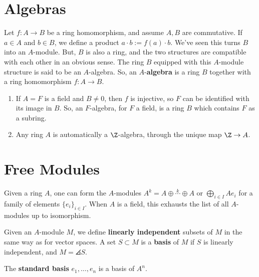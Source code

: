 \section{Algebras}

\begin{defn}
    Let $f:A \to B$ be a ring homomorphism, and assume $A,B$ are commutative. If $a \in A$ and $b \in B$, we define a product $a \cdot b := f(a)\cdot b$. We've seen this turns $B$ into an $A$-module. But, $B$ is also a ring, and the two structures are compatible with each other in an obvious sense. The ring $B$ equipped with this $A$-module structure is said to be an $A$-algebra. So, an $A$-\textbf{algebra} is a ring $B$ together with a ring homomorphism $f:A \to B$.
\end{defn}

\begin{rmk}
    \begin{enumerate}
        \item If $A=F$ is a field and $B \neq 0$, then $f$ is injective, so $F$ can be identified with its image in $B$. So, an $F$-algebra, for $F$ a field, is a ring $B$ which contains $F$ as a subring.
        \item Any ring $A$ is automatically a $\Z$-algebra, through the unique map $\Z \to A$.
    \end{enumerate}
\end{rmk}

\section{Free Modules}

\begin{defn}
    Given a ring $A$, one can form the $A$-modules $A^k = A \oplus \overset{k }{\cdots }\oplus A$ or $\bigoplus_{i \in I}Ae_i$ for a family of elements $\{e_i\}_{i \in I}$. When $A$ is a field, this exhausts the list of all $A$-modules up to isomorphism.
\end{defn}

\begin{defn}
    Given an $A$-module $M$, we define \textbf{linearly independent} subsets of $M$ in the same way as for vector spaces. A set $S \subset M$ is a \textbf{basis} of $M$ if $S$ is linearly independent, and $M = \angles{S}$.
\end{defn}

\begin{ex}
    The \textbf{standard basis} $e_1,\dots,e_n$ is a basis of $A^n$.
\end{ex}

